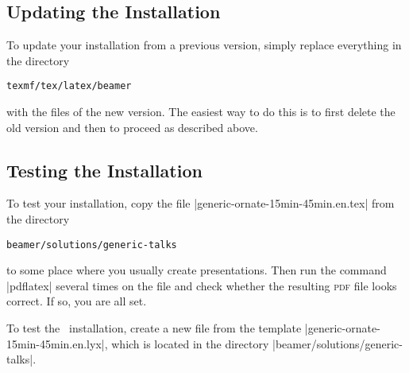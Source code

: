 \subsection{Updating the Installation}

To update your installation from a previous version, simply replace
everything in the directory
\begin{verbatim}
texmf/tex/latex/beamer
\end{verbatim}
with the files of the new version. The easiest way to do this is to
first delete the old version and then to proceed as described above.


\subsection{Testing the Installation}

To test your installation, copy the file
|generic-ornate-15min-45min.en.tex| from the directory
\begin{verbatim}
beamer/solutions/generic-talks
\end{verbatim}
to some place where you usually
create presentations. Then run the command |pdflatex| several times on
the file and check whether the resulting \textsc{pdf} file looks
correct. If so, you are all set.

\lyxnote
To test the \LyX\ installation, create a new file from the
template |generic-ornate-15min-45min.en.lyx|, which is located in the directory
|beamer/solutions/generic-talks|.




